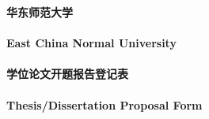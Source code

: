 \documentclass[a4paper,zihao=-4,AutoFakeBold]{ctexart}
\begin{document}
\pagestyle{empty}


\vspace{-10ex} %
\vspace*{11.3ex}  %

\begin{center}
    \vspace{-0.5cm}
    {\bfseries\bsongti 华东师范大学}\\~\\
    {\bfseries East China Normal University}\\~\\
    {\bfseries\bsongti 学位论文开题报告登记表}\\~\\
    {\bfseries Thesis/Dissertation Proposal Form}
    \vspace{0.4cm}
\end{center}
\end{document}
